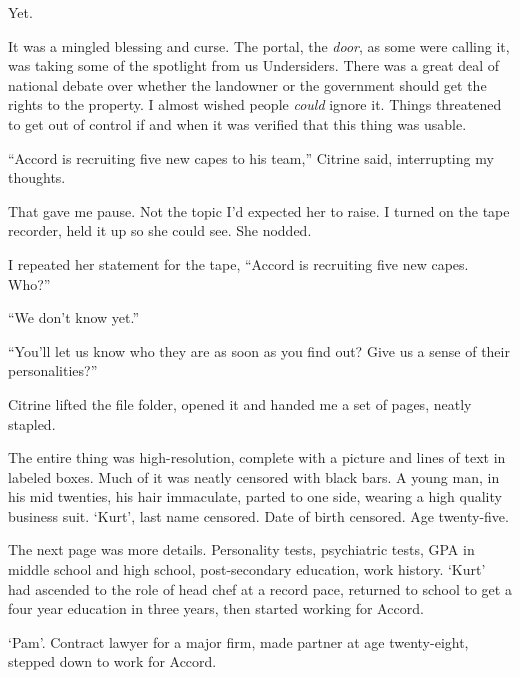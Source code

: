 Yet.



It was a mingled blessing and curse.  The portal, the \emph{door}, as some were calling it, was taking some of the spotlight from us Undersiders.  There was a great deal of national debate over whether the landowner or the government should get the rights to the property.  I almost wished people \emph{could} ignore it.  Things threatened to get out of control if and when it was verified that this thing was usable.



``Accord is recruiting five new capes to his team,'' Citrine said, interrupting my thoughts.



That gave me pause.  Not the topic I'd expected her to raise.  I turned on the tape recorder, held it up so she could see.  She nodded.



I repeated her statement for the tape, ``Accord is recruiting five new capes.  Who?''



``We don't know yet.''



``You'll let us know who they are as soon as you find out?  Give us a sense of their personalities?''



Citrine lifted the file folder, opened it and handed me a set of pages, neatly stapled.



The entire thing was high-resolution, complete with a picture and lines of text in labeled boxes.  Much of it was neatly censored with black bars.  A young man, in his mid twenties, his hair immaculate, parted to one side, wearing a high quality business suit.  `Kurt', last name censored.  Date of birth censored.  Age twenty-five.



The next page was more details.  Personality tests, psychiatric tests, GPA in middle school and high school, post-secondary education, work history.  `Kurt' had ascended to the role of head chef at a record pace, returned to school to get a four year education in three years, then started working for Accord.



`Pam'.  Contract lawyer for a major firm, made partner at age twenty-eight, stepped down to work for Accord.



